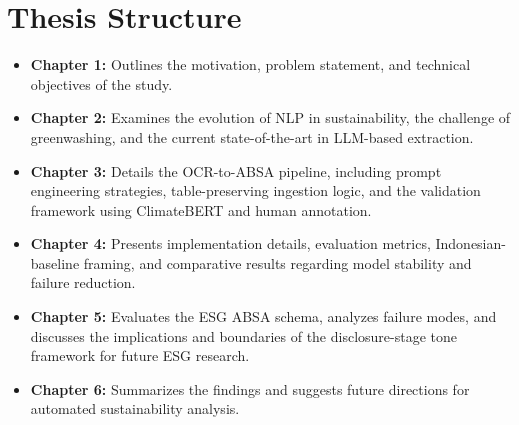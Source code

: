 \section{Thesis Structure}
\begin{itemize}
\item 

\textbf{Chapter 1:} Outlines the motivation, problem statement, and technical objectives of the study.\item 

\textbf{Chapter 2:} Examines the evolution of NLP in sustainability, the challenge of greenwashing, and the current state-of-the-art in LLM-based extraction.\item 

\textbf{Chapter 3:} Details the OCR-to-ABSA pipeline, including prompt engineering strategies, table-preserving ingestion logic, and the validation framework using ClimateBERT and human annotation.\item 

\textbf{Chapter 4:} Presents implementation details, evaluation metrics, Indonesian-baseline framing, and comparative results regarding model stability and failure reduction.\item 

\textbf{Chapter 5:} Evaluates the ESG ABSA schema, analyzes failure modes, and discusses the implications and boundaries of the disclosure-stage tone framework for future ESG research.\item 

\textbf{Chapter 6:} Summarizes the findings and suggests future directions for automated sustainability analysis.
\end{itemize}
